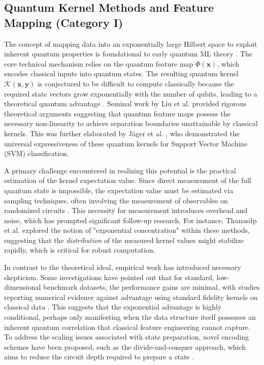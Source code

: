 \documentclass{article}
\begin{document}
\label{sec:detailed\_review\_of\_methodological\_approa}

\subsection{Quantum Kernel Methods and Feature Mapping (Category I)}

\label{sec:quantum\_kernel\_methods\_and\_feature\_mappi}

The concept of mapping data into an exponentially large Hilbert space to exploit inherent quantum properties is foundational to early quantum ML theory \cite{zeguendry2023quantum}. The core technical mechanism relies on the quantum feature map $\Phi(\mathbf{x})$, which encodes classical inputs into quantum states. The resulting quantum kernel $\mathcal{K}(\mathbf{x}, \mathbf{y})$ is conjectured to be difficult to compute classically because the required state vectors grow exponentially with the number of qubits, leading to a theoretical quantum advantage \cite{liu2021rigorous}. Seminal work by Liu et al. \cite{liu2021rigorous} provided rigorous theoretical arguments suggesting that quantum feature maps possess the necessary non-linearity to achieve separation boundaries unattainable by classical kernels. This was further elaborated by Jäger et al. \cite{jager2023universal}, who demonstrated the universal expressiveness of these quantum kernels for Support Vector Machine (SVM) classification.

A primary challenge encountered in realizing this potential is the practical estimation of the kernel expectation value. Since direct measurement of the full quantum state is impossible, the expectation value must be estimated via sampling techniques, often involving the measurement of observables on randomized circuits \cite{haug2023quantum}. This necessity for measurement introduces overhead and noise, which has prompted significant follow-up research. For instance, Thanasilp et al. \cite{thanasilp2024exponential} explored the notion of "exponential concentration" within these methods, suggesting that the \textit{distribution} of the measured kernel values might stabilize rapidly, which is critical for robust computation.

In contrast to the theoretical ideal, empirical work has introduced necessary skepticism. Some investigations have pointed out that for standard, low-dimensional benchmark datasets, the performance gains are minimal, with studies reporting numerical evidence against advantage using standard fidelity kernels on classical data \cite{slattery2023numerical}. This suggests that the exponential advantage is highly conditional, perhaps only manifesting when the data structure itself possesses an inherent quantum correlation that classical feature engineering cannot capture. To address the scaling issues associated with state preparation, novel encoding schemes have been proposed, such as the divide-and-conquer approach, which aims to reduce the circuit depth required to prepare a state \cite{araujo2021divideandconquer}.
\end{document}
